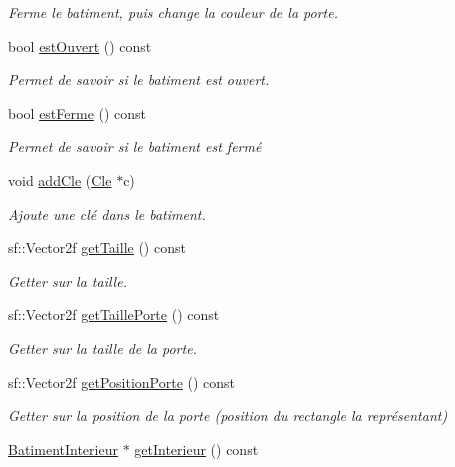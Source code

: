 \begin{DoxyCompactItemize}
\begin{DoxyCompactList}\small\item\em Ferme le batiment, puis change la couleur de la porte. \end{DoxyCompactList}\item 
bool \hyperlink{classBatimentExterieur_a89e6aa6f39f9fa960ece00289325ef96}{est\-Ouvert} () const 
\begin{DoxyCompactList}\small\item\em Permet de savoir si le batiment est ouvert. \end{DoxyCompactList}\item 
bool \hyperlink{classBatimentExterieur_a0f7131a58c2a36bfd7889409da5e2383}{est\-Ferme} () const 
\begin{DoxyCompactList}\small\item\em Permet de savoir si le batiment est fermé \end{DoxyCompactList}\item 
void \hyperlink{classBatimentExterieur_adc622081f64c75d9523ea56c028eca54}{add\-Cle} (\hyperlink{classCle}{Cle} $\ast$c)
\begin{DoxyCompactList}\small\item\em Ajoute une clé dans le batiment. \end{DoxyCompactList}\item 
sf\-::\-Vector2f \hyperlink{classBatimentExterieur_ac85920cb049dfafdbcdf0a8a70b2d2fb}{get\-Taille} () const 
\begin{DoxyCompactList}\small\item\em Getter sur la taille. \end{DoxyCompactList}\item 
sf\-::\-Vector2f \hyperlink{classBatimentExterieur_a6fb757558a77b6b84fd7f5fe5f60b4f9}{get\-Taille\-Porte} () const 
\begin{DoxyCompactList}\small\item\em Getter sur la taille de la porte. \end{DoxyCompactList}\item 
sf\-::\-Vector2f \hyperlink{classBatimentExterieur_ae11a31a7867fe7f87db1592dd7104786}{get\-Position\-Porte} () const 
\begin{DoxyCompactList}\small\item\em Getter sur la position de la porte (position du rectangle la représentant) \end{DoxyCompactList}\item 
\hyperlink{classBatimentInterieur}{Batiment\-Interieur} $\ast$ \hyperlink{classBatimentExterieur_a0837a7b3fe1e4a1d4fb5f10c0522c0ce}{get\-Interieur} () const 

\end{DoxyCompactItemize}
